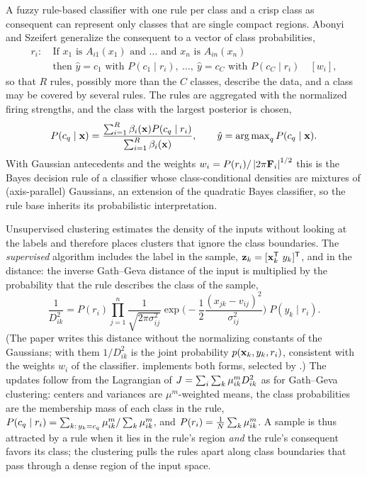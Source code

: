 A fuzzy rule-based classifier with one rule per class and a crisp class as consequent can represent only classes that are single compact regions. Abonyi and Szeifert \cite{abonyi:2003:supervised} generalize the consequent to a vector of class probabilities,
\begin{equation}
  \begin{aligned}
  r_i:\ &\text{If } x_1 \text{ is } A_{i1}(x_1) \text{ and } \dots \text{ and } x_n \text{ is } A_{in}(x_n)\\
        &\text{then } \hat y=c_1 \text{ with } P(c_1\mid r_i),\ \dots,\ \hat y=c_C \text{ with } P(c_C\mid r_i)\quad [w_i],
  \end{aligned}
  \label{eq:models:classrule}
\end{equation}
so that $R$ rules, possibly more than the $C$ classes, describe the data, and a class may be covered by several rules. The rules are aggregated with the normalized firing strengths, and the class with the largest posterior is chosen,
\begin{equation}
  P(c_q\mid\mathbf{x})=\frac{\sum_{i=1}^{R}\beta_i(\mathbf{x})P(c_q\mid r_i)}{\sum_{i=1}^{R}\beta_i(\mathbf{x})},\qquad
  \hat y=\operatorname{arg\,max}_q P(c_q\mid\mathbf{x}).
  \label{eq:models:classposterior}
\end{equation}
With Gaussian antecedents and the weights $w_i=P(r_i)/\left\lvert 2\pi\mathbf{F}_i \right\rvert^{1/2}$ this is the Bayes decision rule of a classifier whose class-conditional densities are mixtures of (axis-parallel) Gaussians, an extension of the quadratic Bayes classifier, so the rule base inherits its probabilistic interpretation.

Unsupervised clustering estimates the density of the inputs without looking at the labels and therefore places clusters that ignore the class boundaries. The \emph{supervised} algorithm includes the label in the sample, $\mathbf{z}_k=[\xk\T\ y_k]\T$, and in the distance: the inverse Gath--Geva distance of the input is multiplied by the probability that the rule describes the class of the sample,
\begin{equation}
  \frac{1}{D^2_{ik}}=P(r_i)\prod_{j=1}^{n}\frac{1}{\sqrt{2\pi\sigma^2_{ij}}}\exp\!\Big(-\frac12\frac{(x_{jk}-v_{ij})^2}{\sigma^2_{ij}}\Big)\;P(y_k\mid r_i).
  \label{eq:models:supdist}
\end{equation}
(The paper writes this distance without the normalizing constants of the Gaussians; with them $1/D^2_{ik}$ is the joint probability $p(\mathbf{x}_k,y_k,r_i)$, consistent with the weights $w_i$ of the classifier.  implements both forms, selected by .) The updates follow from the Lagrangian of $J=\sum_i\sum_k\mu_{ik}^m D^2_{ik}$ as for Gath--Geva clustering: centers and variances are $\mu^m$-weighted means, the class probabilities are the membership mass of each class in the rule, $P(c_q\mid r_i)=\sum_{k:\,y_k=c_q}\mu_{ik}^m/\sum_k\mu_{ik}^m$, and $P(r_i)=\frac1N\sum_k\mu_{ik}^m$. A sample is thus attracted by a rule when it lies in the rule's region \emph{and} the rule's consequent favors its class; the clustering pulls the rules apart along class boundaries that pass through a dense region of the input space.

